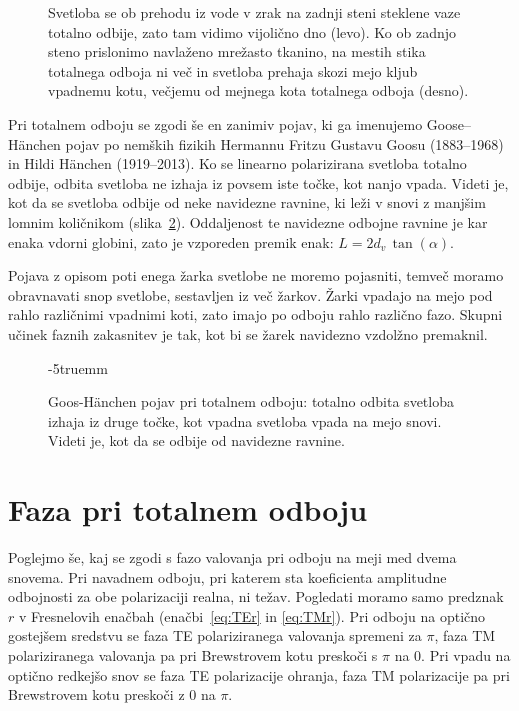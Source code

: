 \begin{figure}[ht]
\caption{Svetloba se ob prehodu iz vode v zrak na zadnji steni steklene vaze 
totalno odbije, zato tam vidimo vijolično dno (levo). Ko ob zadnjo steno prislonimo
navlaženo mrežasto tkanino, na mestih stika totalnega odboja ni več in svetloba prehaja
skozi mejo kljub vpadnemu kotu, večjemu od mejnega kota totalnega odboja (desno).}
\label{fig:04_FTIRfoto}

\end{figure}
\begin{remark}
Pri totalnem odboju se zgodi še en zanimiv pojav, ki ga imenujemo Goose--H\"anchen pojav 
po nemških fizikih Hermannu Fritzu Gustavu Goosu (1883--1968) in Hildi H\"anchen 
(1919--2013).
Ko se linearno polarizirana svetloba totalno odbije, odbita svetloba ne izhaja iz 
povsem iste točke, kot nanjo vpada. Videti je, kot da se svetloba odbije od neke 
navidezne ravnine, ki leži v snovi z manjšim lomnim količnikom (slika~\ref{fig:04_Goos}). 
Oddaljenost te navidezne odbojne ravnine je kar enaka vdorni globini, 
zato je vzporeden premik enak: $L = 2d_v\,\tan(\alpha)$.

Pojava z opisom poti enega žarka svetlobe ne moremo pojasniti, temveč moramo
obravnavati snop svetlobe, sestavljen iz več žarkov. Žarki vpadajo na mejo pod rahlo
različnimi vpadnimi koti, zato imajo po odboju rahlo različno fazo. Skupni 
učinek faznih zakasnitev je tak, kot bi se žarek navidezno vzdolžno premaknil. 
\begin{figure}[ht]
\centering
\def\svgwidth{70truemm} 

\caption{Goos-H\"anchen pojav pri totalnem odboju: totalno odbita svetloba izhaja iz druge točke, 
kot vpadna svetloba vpada na mejo snovi. Videti je, kot da se odbije od navidezne ravnine.}
\label{fig:04_Goos}
\vglue-5truemm\end{figure}
\end{remark}

\section{Faza pri totalnem odboju}
Poglejmo še, kaj se zgodi s fazo valovanja pri odboju na meji med dvema snovema. 
Pri navadnem odboju, pri katerem sta koeficienta
amplitudne odbojnosti za obe polarizaciji realna, ni težav. 
Pogledati moramo samo predznak $r$ v Fresnelovih enačbah (enačbi~\ref{eq:TEr} 
in \ref{eq:TMr}). Pri odboju na 
optično gostejšem sredstvu se faza TE polariziranega valovanja 
spremeni za $\pi$, faza TM polariziranega
valovanja pa pri Brewstrovem kotu preskoči s $\pi$ na 0. 
Pri vpadu na optično redkejšo snov se faza
TE polarizacije ohranja, faza TM polarizacije pa pri 
Brewstrovem kotu preskoči z 0 na $\pi$.  

